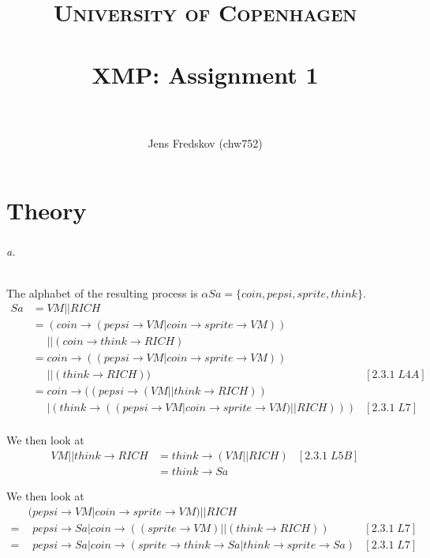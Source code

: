 \documentclass[a4paper, 11pt]{article}
\title{ 
\normalfont \normalsize 
\textsc{University of Copenhagen} \\ [25pt]
\horrule{0.5pt} \\[0.4cm]
\huge XMP: Assignment 1 \\
\horrule{2pt} \\[0.5cm]
}
\author{Jens Fredskov (chw752)}
\begin{document}
\maketitle

\part{Theory} %
\label{prt:theory_}

\section{} %


\section{} %

\paragraph{a.} %
\label{par:a_}

The alphabet of the resulting process is $\alpha Sa = \{coin, pepsi, sprite, think\}$.
\begin{align*}
Sa &= VM || RICH \\
   &= (coin \rightarrow (pepsi \rightarrow VM | coin \rightarrow sprite \rightarrow VM)) \\
   &\phantom{=} || (coin \rightarrow think \rightarrow RICH) \\
   &= coin \rightarrow ((pepsi \rightarrow VM | coin \rightarrow sprite \rightarrow VM)) \\
   &\phantom{=} || (think \rightarrow RICH)) & [2.3.1\;L4A] \\
   &= coin \rightarrow ((pepsi \rightarrow (VM || think \rightarrow RICH)) \\
   &\phantom{=} | (think \rightarrow ((pepsi \rightarrow VM | coin \rightarrow sprite \rightarrow VM) || RICH))) & [2.3.1\;L7] \\
\end{align*}

We then look at
\begin{align*}
VM || think \rightarrow RICH &= think \rightarrow (VM || RICH) & [2.3.1\;L5B]\\
                             &=  think \rightarrow Sa
\end{align*}

We then look at
\begin{align*}
&(pepsi \rightarrow VM | coin \rightarrow sprite \rightarrow VM) || RICH \\
= &\phantom{(} pepsi \rightarrow Sa | coin \rightarrow ((sprite \rightarrow VM) || (think \rightarrow RICH)) & [2.3.1\;L7] \\
= &\phantom{(} pepsi \rightarrow Sa | coin \rightarrow (sprite \rightarrow think \rightarrow Sa | think \rightarrow sprite \rightarrow Sa) & [2.3.1\;L7]
\end{align*}
\end{document}
